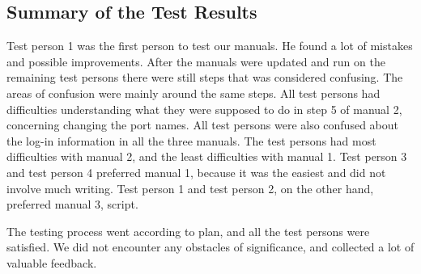\subsection{Summary of the Test Results}
Test person 1 was the first person to test our manuals. He found a lot of mistakes and possible improvements. After the manuals were updated and run on the remaining test persons there were still steps that was considered confusing. The areas of confusion were mainly around the same steps. All test persons had difficulties understanding what they were supposed to do in step 5 of manual 2, concerning changing the port names. All test persons were also confused about the log-in information in all the three manuals. The test persons had most difficulties with manual 2, and the least difficulties with manual 1. Test person 3 and test person 4 preferred manual 1, because it was the easiest and did not involve much writing. Test person 1 and test person 2, on the other hand, preferred manual 3, script. 

The testing process went according to plan, and all the test persons were satisfied. We did not encounter any obstacles of significance, and collected a lot of valuable feedback.  